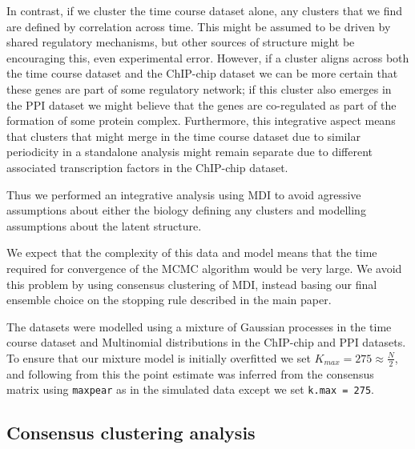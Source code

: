 \documentclass[]{article}
\begin{document}
In contrast, if we cluster the time course  dataset alone, any clusters that we find are defined by correlation across time. This might be assumed to be driven by shared regulatory mechanisms, but other sources of structure might be encouraging this, even experimental error. However, if a cluster aligns across both the time course  dataset and the ChIP-chip dataset we can be more certain that these genes are part of some regulatory network; if this cluster also emerges in the PPI dataset we might believe that the genes are co-regulated as part of the formation of some protein complex. Furthermore, this integrative aspect means that clusters that might merge in the time course  dataset due to similar periodicity in a standalone analysis might remain separate due to different associated transcription factors in the ChIP-chip dataset.

Thus we performed an integrative analysis using MDI to avoid agressive assumptions about either the biology defining any clusters and modelling assumptions about the latent structure.


We expect that the complexity of this data and model means that the time required for convergence of the MCMC algorithm would be very large. We avoid this problem by using consensus clustering of MDI, instead basing our final ensemble choice on the stopping rule described in the main paper. %

The datasets were modelled using a mixture of Gaussian processes in the time course  dataset and Multinomial distributions in the ChIP-chip and PPI datasets. To ensure that our mixture model is initially overfitted we set $K_{max}=275\approx\frac{N}{2}$, and following from this the point estimate was inferred from the consensus matrix using \texttt{maxpear} as in the simulated data except we set \texttt{k.max = 275}. 

\subsection{Consensus clustering analysis} \label{sec:consensusClustering}
\end{document}

